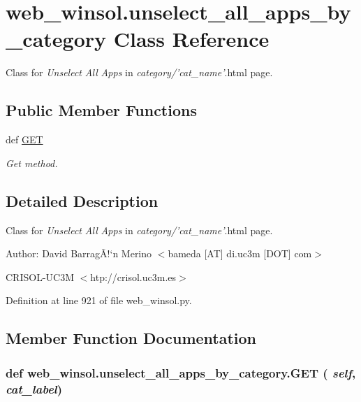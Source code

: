 \hypertarget{classweb__winsol_1_1unselect__all__apps__by__category}{
\section{web\_\-winsol.unselect\_\-all\_\-apps\_\-by\_\-category Class Reference}
\label{classweb__winsol_1_1unselect__all__apps__by__category}
}
Class for {\em Unselect\/} {\em All\/} {\em Apps\/} in {\em category/'cat\_\-name'\/}.html page.  


\subsection*{Public Member Functions}
\begin{CompactItemize}
\item 
def \hyperlink{classweb__winsol_1_1unselect__all__apps__by__category_857ed434b49040974e2d5c599a44a865}{GET}
\begin{CompactList}\small\item\em Get method. \item\end{CompactList}\end{CompactItemize}


\subsection{Detailed Description}
Class for {\em Unselect\/} {\em All\/} {\em Apps\/} in {\em category/'cat\_\-name'\/}.html page. 

\begin{Desc}
\item[Author:]David Barrag\~{A}!`n Merino $<$bameda \mbox{[}AT\mbox{]} di.uc3m \mbox{[}DOT\mbox{]} com$>$ 

CRISOL-UC3M $<$htp://crisol.uc3m.es$>$ \end{Desc}




Definition at line 921 of file web\_\-winsol.py.

\subsection{Member Function Documentation}
\hypertarget{classweb__winsol_1_1unselect__all__apps__by__category_857ed434b49040974e2d5c599a44a865}{
\subsubsection[GET]{\setlength{\rightskip}{0pt plus 5cm}def web\_\-winsol.unselect\_\-all\_\-apps\_\-by\_\-category.GET ( {\em self},  {\em cat\_\-label})}}
\label{classweb__winsol_1_1unselect__all__apps__by__category_857ed434b49040974e2d5c599a44a865}


